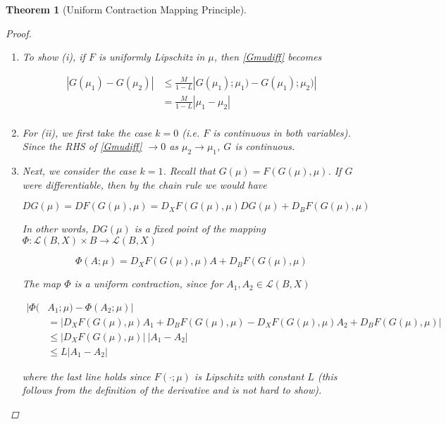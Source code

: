 \documentclass{article}
\newtheorem{theorem}{Theorem}[section]
\begin{document}
\begin{theorem}[Uniform Contraction Mapping Principle]
\begin{proof}
\begin{enumerate}
\begin{align*}
(1 - L)|G(\mu_1) - G(\mu_2)| 
&\leq |F( G(\mu_1); \mu_1) - F(G(\mu_1); \mu_2)|
\end{align*}

Divide by $(1 - L)$ to get 

\begin{align}\label{Gmudiff}
|G(\mu_1) - G(\mu_2)| &\leq \frac{1}{1-L}|F( G(\mu_1); \mu_1) - F(G(\mu_2); \mu_2)|
\end{align}

\item To show (i), if $F$ is uniformly Lipschitz in $\mu$, then \eqref{Gmudiff} becomes 

\begin{align*}
|G(\mu_1) - G(\mu_2)| &\leq \frac{M}{1-L}| G(\mu_1); \mu_1) - G(\mu_1); \mu_2)| \\
&= \frac{M}{1-L} |\mu_1 - \mu_2| \\
\end{align*}

\item For (ii), we first take the case $k = 0$ (i.e. $F$ is continuous in both variables). Since the RHS of \eqref{Gmudiff} $\rightarrow 0$ as $\mu_2 \rightarrow \mu_1$, $G$ is continuous.

\item Next, we consider the case $k = 1$. Recall that $G(\mu) = F(G(\mu),\mu)$. If $G$ were differentiable, then by the chain rule we would have

\[
DG(\mu) = DF(G(\mu),\mu) = D_X F(G(\mu), \mu)DG(\mu) + D_B F(G(\mu), \mu)
\]

In other words, $DG(\mu)$ is a fixed point of the mapping $\Phi: \mathcal{L}(B, X) \times B \rightarrow \mathcal{L}(B, X)$

\[
\Phi(A; \mu) = D_X F(G(\mu), \mu) A + D_B F(G(\mu), \mu)
\]

The map $\Phi$ is a uniform contraction, since for $A_1, A_2 \in \mathcal{L}(B, X)$

\begin{align*}
|\Phi(&A_1; \mu) - \Phi(A_2; \mu)| \\
&= | D_X F(G(\mu), \mu) A_1 + D_B F(G(\mu), \mu) - D_X F(G(\mu), \mu) A_2 + D_B F(G(\mu), \mu) | \\
&\leq | D_X F(G(\mu), \mu) |\:|A_1 - A_2| \\
&\leq L |A_1 - A_2|
\end{align*}

where the last line holds since $F(\cdot; \mu)$ is Lipschitz with constant $L$ (this follows from the definition of the derivative and is not hard to show).\\


\end{enumerate}
\end{proof}
\end{theorem}
\end{document}
